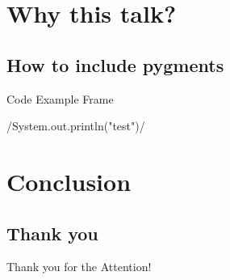 \section{Why this talk?}

\subsection{How to include pygments}
\begin{frame}{Code Example Frame}
  \begin{listing}[H]
    /System.out.println("test")/
  \end{listing}
\end{frame}

\section{Conclusion}

\subsection{Thank you}
\begin{frame}
  Thank you for the Attention!
\end{frame}

